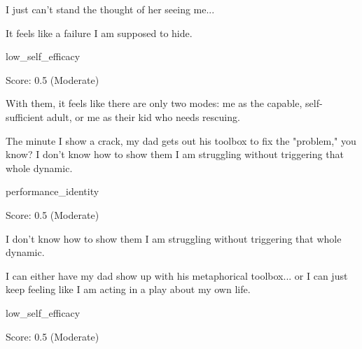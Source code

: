 \begin{tcolorbox}[
    colback=gray!5, colframe=gray!50, arc=2mm, boxrule=0.5pt,
    left=5pt, right=5pt, enhanced, drop shadow, breakable
]
\begin{description}[leftmargin=3.5cm, labelwidth=3.2cm, font=\bfseries, nosep]
    \item[Belief] I just can't stand the thought of her seeing me...
    \item[Action] It feels like a failure I am supposed to hide.
    \item[Belief Type] low\_self\_efficacy
    \item[Metrics] Score: 0.5 (Moderate)
\end{description}
\end{tcolorbox}

\begin{tcolorbox}[
    colback=gray!5, colframe=gray!50, arc=2mm, boxrule=0.5pt,
    left=5pt, right=5pt, enhanced, drop shadow, breakable
]
\begin{description}[leftmargin=3.5cm, labelwidth=3.2cm, font=\bfseries, nosep]
    \item[Belief] With them, it feels like there are only two modes: me as the capable, self-sufficient adult, or me as their kid who needs rescuing.
    \item[Action] The minute I show a crack, my dad gets out his toolbox to fix the "problem," you know? I don't know how to show them I am struggling without triggering that whole dynamic.
    \item[Belief Type] performance\_identity
    \item[Metrics] Score: 0.5 (Moderate)
\end{description}
\end{tcolorbox}

\begin{tcolorbox}[
    colback=gray!5, colframe=gray!50, arc=2mm, boxrule=0.5pt,
    left=5pt, right=5pt, enhanced, drop shadow, breakable
]
\begin{description}[leftmargin=3.5cm, labelwidth=3.2cm, font=\bfseries, nosep]
    \item[Belief] I don't know how to show them I am struggling without triggering that whole dynamic.
    \item[Action] I can either have my dad show up with his metaphorical toolbox... or I can just keep feeling like I am acting in a play about my own life.
    \item[Belief Type] low\_self\_efficacy
    \item[Metrics] Score: 0.5 (Moderate)
\end{description}
\end{tcolorbox}


